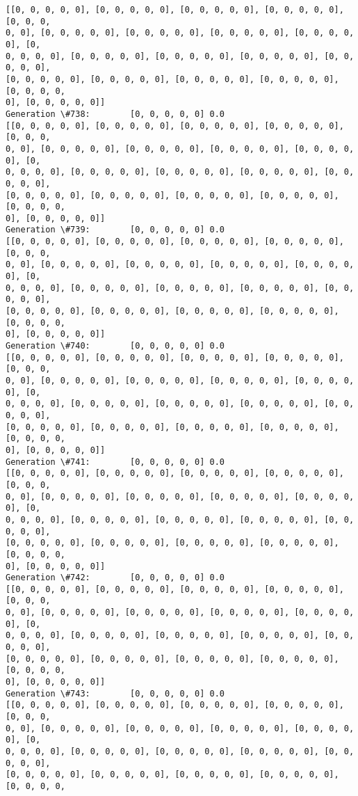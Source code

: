 \documentclass[11pt]{article}
\begin{document}
\begin{Verbatim}[commandchars=\\\{\}]
[[0, 0, 0, 0, 0], [0, 0, 0, 0, 0], [0, 0, 0, 0, 0], [0, 0, 0, 0, 0], [0, 0, 0,
0, 0], [0, 0, 0, 0, 0], [0, 0, 0, 0, 0], [0, 0, 0, 0, 0], [0, 0, 0, 0, 0], [0,
0, 0, 0, 0], [0, 0, 0, 0, 0], [0, 0, 0, 0, 0], [0, 0, 0, 0, 0], [0, 0, 0, 0, 0],
[0, 0, 0, 0, 0], [0, 0, 0, 0, 0], [0, 0, 0, 0, 0], [0, 0, 0, 0, 0], [0, 0, 0, 0,
0], [0, 0, 0, 0, 0]]
Generation \#738:        [0, 0, 0, 0, 0] 0.0
[[0, 0, 0, 0, 0], [0, 0, 0, 0, 0], [0, 0, 0, 0, 0], [0, 0, 0, 0, 0], [0, 0, 0,
0, 0], [0, 0, 0, 0, 0], [0, 0, 0, 0, 0], [0, 0, 0, 0, 0], [0, 0, 0, 0, 0], [0,
0, 0, 0, 0], [0, 0, 0, 0, 0], [0, 0, 0, 0, 0], [0, 0, 0, 0, 0], [0, 0, 0, 0, 0],
[0, 0, 0, 0, 0], [0, 0, 0, 0, 0], [0, 0, 0, 0, 0], [0, 0, 0, 0, 0], [0, 0, 0, 0,
0], [0, 0, 0, 0, 0]]
Generation \#739:        [0, 0, 0, 0, 0] 0.0
[[0, 0, 0, 0, 0], [0, 0, 0, 0, 0], [0, 0, 0, 0, 0], [0, 0, 0, 0, 0], [0, 0, 0,
0, 0], [0, 0, 0, 0, 0], [0, 0, 0, 0, 0], [0, 0, 0, 0, 0], [0, 0, 0, 0, 0], [0,
0, 0, 0, 0], [0, 0, 0, 0, 0], [0, 0, 0, 0, 0], [0, 0, 0, 0, 0], [0, 0, 0, 0, 0],
[0, 0, 0, 0, 0], [0, 0, 0, 0, 0], [0, 0, 0, 0, 0], [0, 0, 0, 0, 0], [0, 0, 0, 0,
0], [0, 0, 0, 0, 0]]
Generation \#740:        [0, 0, 0, 0, 0] 0.0
[[0, 0, 0, 0, 0], [0, 0, 0, 0, 0], [0, 0, 0, 0, 0], [0, 0, 0, 0, 0], [0, 0, 0,
0, 0], [0, 0, 0, 0, 0], [0, 0, 0, 0, 0], [0, 0, 0, 0, 0], [0, 0, 0, 0, 0], [0,
0, 0, 0, 0], [0, 0, 0, 0, 0], [0, 0, 0, 0, 0], [0, 0, 0, 0, 0], [0, 0, 0, 0, 0],
[0, 0, 0, 0, 0], [0, 0, 0, 0, 0], [0, 0, 0, 0, 0], [0, 0, 0, 0, 0], [0, 0, 0, 0,
0], [0, 0, 0, 0, 0]]
Generation \#741:        [0, 0, 0, 0, 0] 0.0
[[0, 0, 0, 0, 0], [0, 0, 0, 0, 0], [0, 0, 0, 0, 0], [0, 0, 0, 0, 0], [0, 0, 0,
0, 0], [0, 0, 0, 0, 0], [0, 0, 0, 0, 0], [0, 0, 0, 0, 0], [0, 0, 0, 0, 0], [0,
0, 0, 0, 0], [0, 0, 0, 0, 0], [0, 0, 0, 0, 0], [0, 0, 0, 0, 0], [0, 0, 0, 0, 0],
[0, 0, 0, 0, 0], [0, 0, 0, 0, 0], [0, 0, 0, 0, 0], [0, 0, 0, 0, 0], [0, 0, 0, 0,
0], [0, 0, 0, 0, 0]]
Generation \#742:        [0, 0, 0, 0, 0] 0.0
[[0, 0, 0, 0, 0], [0, 0, 0, 0, 0], [0, 0, 0, 0, 0], [0, 0, 0, 0, 0], [0, 0, 0,
0, 0], [0, 0, 0, 0, 0], [0, 0, 0, 0, 0], [0, 0, 0, 0, 0], [0, 0, 0, 0, 0], [0,
0, 0, 0, 0], [0, 0, 0, 0, 0], [0, 0, 0, 0, 0], [0, 0, 0, 0, 0], [0, 0, 0, 0, 0],
[0, 0, 0, 0, 0], [0, 0, 0, 0, 0], [0, 0, 0, 0, 0], [0, 0, 0, 0, 0], [0, 0, 0, 0,
0], [0, 0, 0, 0, 0]]
Generation \#743:        [0, 0, 0, 0, 0] 0.0
[[0, 0, 0, 0, 0], [0, 0, 0, 0, 0], [0, 0, 0, 0, 0], [0, 0, 0, 0, 0], [0, 0, 0,
0, 0], [0, 0, 0, 0, 0], [0, 0, 0, 0, 0], [0, 0, 0, 0, 0], [0, 0, 0, 0, 0], [0,
0, 0, 0, 0], [0, 0, 0, 0, 0], [0, 0, 0, 0, 0], [0, 0, 0, 0, 0], [0, 0, 0, 0, 0],
[0, 0, 0, 0, 0], [0, 0, 0, 0, 0], [0, 0, 0, 0, 0], [0, 0, 0, 0, 0], [0, 0, 0, 0,

\end{Verbatim}
\end{document}
